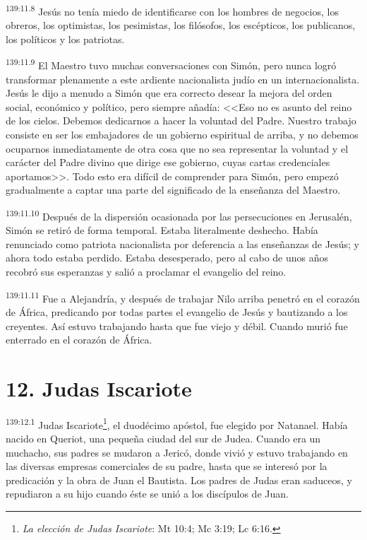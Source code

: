 \par 
\textsuperscript{139:11.8} Jesús no tenía miedo de identificarse con los hombres de negocios, los obreros, los optimistas, los pesimistas, los filósofos, los escépticos, los publicanos, los políticos y los patriotas.

\par 
\textsuperscript{139:11.9} El Maestro tuvo muchas conversaciones con Simón, pero nunca logró transformar plenamente a este ardiente nacionalista judío en un internacionalista. Jesús le dijo a menudo a Simón que era correcto desear la mejora del orden social, económico y político, pero siempre añadía: <<Eso no es asunto del reino de los cielos. Debemos dedicarnos a hacer la voluntad del Padre. Nuestro trabajo consiste en ser los embajadores de un gobierno espiritual de arriba, y no debemos ocuparnos inmediatamente de otra cosa que no sea representar la voluntad y el carácter del Padre divino que dirige ese gobierno, cuyas cartas credenciales aportamos>>. Todo esto era difícil de comprender para Simón, pero empezó gradualmente a captar una parte del significado de la enseñanza del Maestro.

\par 
\textsuperscript{139:11.10} Después de la dispersión ocasionada por las persecuciones en Jerusalén, Simón se retiró de forma temporal. Estaba literalmente deshecho. Había renunciado como patriota nacionalista por deferencia a las enseñanzas de Jesús; y ahora todo estaba perdido. Estaba desesperado, pero al cabo de unos años recobró sus esperanzas y salió a proclamar el evangelio del reino.

\par 
\textsuperscript{139:11.11} Fue a Alejandría, y después de trabajar Nilo arriba penetró en el corazón de África, predicando por todas partes el evangelio de Jesús y bautizando a los creyentes. Así estuvo trabajando hasta que fue viejo y débil. Cuando murió fue enterrado en el corazón de
África.

\section*{12. Judas Iscariote}
\par 
\textsuperscript{139:12.1} Judas Iscariote\footnote{\textit{La elección de Judas Iscariote}: Mt 10:4; Mc 3:19; Lc 6:16.}, el duodécimo apóstol, fue elegido por Natanael. Había nacido en Queriot, una pequeña ciudad del sur de Judea. Cuando era un muchacho, sus padres se mudaron a Jericó, donde vivió y estuvo trabajando en las diversas empresas comerciales de su padre, hasta que se interesó por la predicación y la obra de Juan el Bautista. Los padres de Judas eran saduceos, y repudiaron a su hijo cuando éste se unió a los discípulos de Juan.

